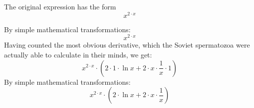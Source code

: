 \documentclass[a4paper, 12pt]{article}
\begin{document}
                          
The original expression has the form \[ {{x} ^ {{2} \cdot {x}}} \]

By simple mathematical transformations: \[ {{x} ^ {{2} \cdot {x}}} \]
 \newline Having counted the most obvious derivative, which the Soviet spermatozoa were actually able to calculate in their minds, we get: \[ {{{x} ^ {{2} \cdot {x}}} \cdot \left({{{{2} \cdot {1}} \cdot  \ln {{x}} } + {{{2} \cdot {x}} \cdot { \frac {{1}} {{x}} \cdot {1}}}}\right)} \]
 \newline By simple mathematical transformations: \[ {{{x} ^ {{2} \cdot {x}}} \cdot \left({{{2} \cdot  \ln {{x}} } + {{{2} \cdot {x}} \cdot  \frac {{1}} {{x}}}}\right)} \]
\end{document}
